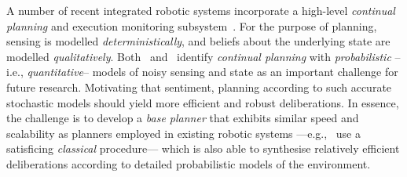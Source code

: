 



A number of recent integrated robotic systems incorporate a
high-level {\em continual planning} and execution monitoring
subsystem~\cite{wyattetal2010tamd,talamadupula:2010,Kraft2008}.
For the purpose of planning, sensing is modelled {\em
deterministically}, and beliefs about the underlying state are
modelled {\em qualitatively}.
Both~\citeauthor{talamadupula:2010} and~\citeauthor{wyattetal2010tamd}
identify
\emph{continual planning} with {\em probabilistic} --i.e., {\em quantitative}--
models of noisy sensing and state as an important challenge for future
research.
Motivating that sentiment, planning according to such accurate
stochastic models should yield more efficient and robust
deliberations.
In essence, the challenge is to develop a {\em base planner} that
exhibits similar speed and scalability as planners employed in
existing robotic systems ---e.g.,~\citeauthor{wyattetal2010tamd} use a
satisficing {\em classical} procedure--- which is also able to
synthesise relatively efficient deliberations according to detailed
probabilistic models of the environment.


